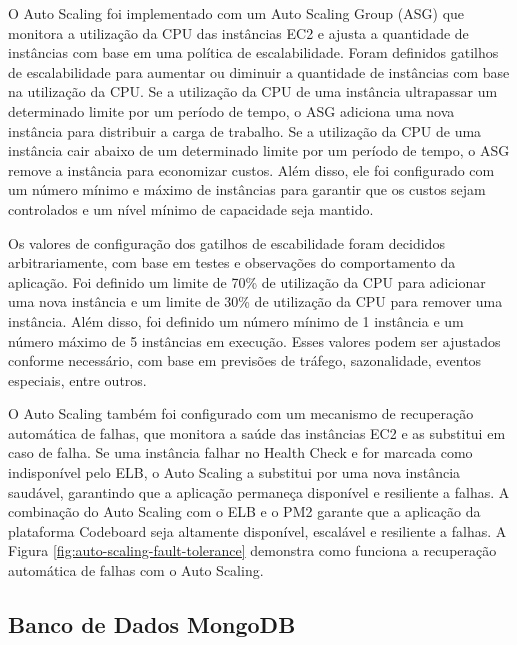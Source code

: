 O Auto Scaling foi implementado com um Auto Scaling Group (ASG) que monitora a utilização da CPU das instâncias EC2 e ajusta a quantidade de instâncias com base em uma política de escalabilidade. Foram definidos gatilhos de escalabilidade para aumentar ou diminuir a quantidade de instâncias com base na utilização da CPU. Se a utilização da CPU de uma instância ultrapassar um determinado limite por um período de tempo, o ASG adiciona uma nova instância para distribuir a carga de trabalho. Se a utilização da CPU de uma instância cair abaixo de um determinado limite por um período de tempo, o ASG remove a instância para economizar custos. Além disso, ele foi configurado com um número mínimo e máximo de instâncias para garantir que os custos sejam controlados e um nível mínimo de capacidade seja mantido. 

Os valores de configuração dos gatilhos de escabilidade foram decididos arbitrariamente, com base em testes e observações do comportamento da aplicação. Foi definido um limite de 70\% de utilização da CPU para adicionar uma nova instância e um limite de 30\% de utilização da CPU para remover uma instância. Além disso, foi definido um número mínimo de 1 instância e um número máximo de 5 instâncias em execução. Esses valores podem ser ajustados conforme necessário, com base em previsões de tráfego, sazonalidade, eventos especiais, entre outros.


O Auto Scaling também foi configurado com um mecanismo de recuperação automática de falhas, que monitora a saúde das instâncias EC2 e as substitui em caso de falha. Se uma instância falhar no Health Check e for marcada como indisponível pelo ELB, o Auto Scaling a substitui por uma nova instância saudável, garantindo que a aplicação permaneça disponível e resiliente a falhas. A combinação do Auto Scaling com o ELB e o PM2 garante que a aplicação da plataforma Codeboard seja altamente disponível, escalável e resiliente a falhas. A Figura \ref{fig:auto-scaling-fault-tolerance} demonstra como funciona a recuperação automática de falhas com o Auto Scaling.


\subsection{Banco de Dados MongoDB}

